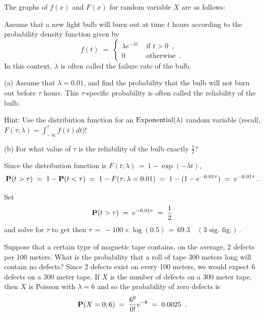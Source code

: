 \begin{ExerciseList}
\item  The graphs of $f(x)$ and $F(x)$ for  random variable $X$ are as follows:

\ee

\Exercise
Assume that a new light bulb will burn out at time $t$ hours according to the probability density function given by 
$$
f(t)\;=\;
\begin{cases}
\lambda e^{-\lambda t} & \text{ if } t >0 \enspace,\\
0 & \text{ otherwise} \enspace .
\end{cases}
$$
In this context, $\lambda$ is often called the failure rate of the bulb.

\be
\item[(a)]Assume that $\lambda=0.01$, and find the probability that the
  bulb will not burn out before $\tau$ hours. This $\tau$-specific probability is often
  called the reliability of the bulb.

Hint: Use the distribution function for an $\mbox{{\rm Exponential}}(\lambda)$ random variable (recall, $F(\tau;\lambda)=\int_{-\infty}^{\tau} f(t) dt$)!

\item[(b)]For what  value of $\tau$ is the reliability of the bulb exactly $\frac{1}{2}$?
\ee
\Answer
\be
\item Since the distribution function is $F(t; \lambda) \,=\,
  1 - \exp( - \lambda t)$,
 \[\mathbf{P}(t>\tau)\;=\;1-\mathbf{P}(t<\tau)\;=\; 1 - F(\tau;\lambda=0.01) \;=\;1-(1-e^{-0.01\tau})\;=\;e^{-0.01\tau}\,.\]

\item Set  \[\mathbf{P}(t>\tau)\;=\;e^{-0.01\tau}\;=\;\frac{1}{2}\]
and solve for $\tau$ to get  then $\tau\,=\,-100\times \log(0.5)\,=\,69.3\quad (\text{3 sig. fig.})$\,.
\ee

\Exercise 
Suppose that a certain type of magnetic tape contains, on the average, 2 defects per 100 meters.  
What is the probability that a roll of tape 300 meters long will contain  no defects?
\Answer
Since 2 defects exist on every 100 meters, we would expect 6 defects on a 300 meter tape.  
If $X$ is the number of defects on a 300 meter tape, then $X$ is Poisson with $\lambda = 6$ and so the probability of zero defects is
$$\mathbf{P}(X=0;6)\;=\;\frac{6^0}{0!}e^{-6}\;=\;0.0025\enspace.$$


\end{ExerciseList}
